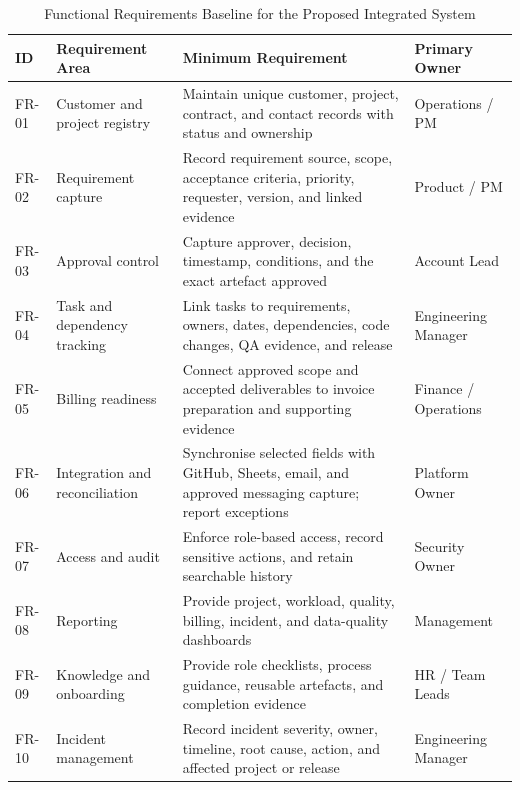 \documentclass[12pt,a4paper]{report}
\begin{document}
\begin{table}[H]
\centering
\caption{Functional Requirements Baseline for the Proposed Integrated System}
\label{tab:functional-requirements}
\scriptsize
\renewcommand{\arraystretch}{1.14}
\begin{tabularx}{\textwidth}{>{\raggedright\arraybackslash}p{1.3cm}
                                >{\raggedright\arraybackslash}p{3.2cm}
                                >{\raggedright\arraybackslash}X
                                >{\raggedright\arraybackslash}p{2.5cm}}
\toprule
\textbf{ID} & \textbf{Requirement Area} & \textbf{Minimum Requirement} & \textbf{Primary Owner} \\
\midrule
FR-01 & Customer and project registry & Maintain unique customer, project, contract, and contact records with status and ownership & Operations / PM \\
FR-02 & Requirement capture & Record requirement source, scope, acceptance criteria, priority, requester, version, and linked evidence & Product / PM \\
FR-03 & Approval control & Capture approver, decision, timestamp, conditions, and the exact artefact approved & Account Lead \\
FR-04 & Task and dependency tracking & Link tasks to requirements, owners, dates, dependencies, code changes, QA evidence, and release & Engineering Manager \\
FR-05 & Billing readiness & Connect approved scope and accepted deliverables to invoice preparation and supporting evidence & Finance / Operations \\
FR-06 & Integration and reconciliation & Synchronise selected fields with GitHub, Sheets, email, and approved messaging capture; report exceptions & Platform Owner \\
FR-07 & Access and audit & Enforce role-based access, record sensitive actions, and retain searchable history & Security Owner \\
FR-08 & Reporting & Provide project, workload, quality, billing, incident, and data-quality dashboards & Management \\
FR-09 & Knowledge and onboarding & Provide role checklists, process guidance, reusable artefacts, and completion evidence & HR / Team Leads \\
FR-10 & Incident management & Record incident severity, owner, timeline, root cause, action, and affected project or release & Engineering Manager \\
\bottomrule
\end{tabularx}
\end{table}
\end{document}
